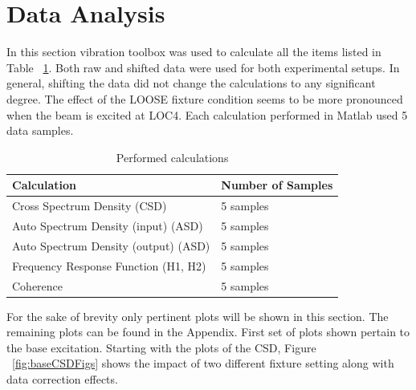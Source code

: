 \documentclass[paper=a4, fontsize=12pt]{scrartcl} %
\begin{document}
\section*{Data Analysis}
In this section vibration toolbox was used to calculate all the items listed in Table ~\ref{table:performedCalculations}. Both raw and shifted data were used for both experimental setups. In general, shifting the data did not change the calculations to any significant degree. The effect of the LOOSE fixture condition seems to be more pronounced when the beam is excited at LOC4. Each calculation performed in Matlab used 5 data samples.
%
\begin{table}[H]
\centering
\begin{tabular}{ l | l }
		\textbf{Calculation} & \textbf{Number of Samples} \\
	\hline                       
		Cross Spectrum Density (CSD) & 5 samples \\
	\hline
		Auto Spectrum Density (input) (ASD) & 5 samples \\
	\hline
		Auto Spectrum Density (output) (ASD) & 5 samples \\
	\hline  
		Frequency Response Function (H1, H2) & 5 samples \\
	\hline  
		Coherence & 5 samples \\
\end{tabular}
\caption{Performed calculations}
\label{table:performedCalculations}
\end{table}
%
For the sake of brevity only pertinent plots will be shown in this section. The remaining plots can be found in the Appendix. First set of plots shown pertain to the base excitation. Starting with the plots of the CSD, Figure ~\ref{fig:baseCSDFigs} shows the impact of two different fixture setting along with data correction effects.
%
\end{document}
